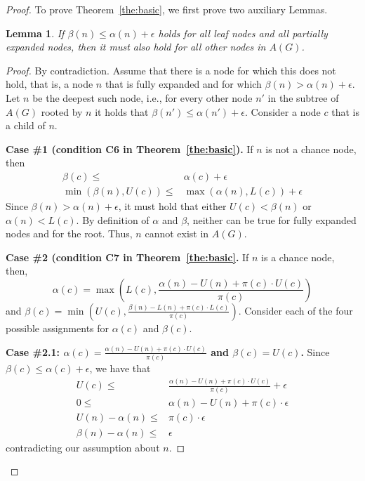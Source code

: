 \documentclass[letterpaper]{article} %
\newtheorem{lemma}{Lemma}
\newcommand{\pess}{\mathit{L}}
\newcommand{\opti}{\mathit{U}}
\begin{document}
\begin{proof}
To prove Theorem~\ref{the:basic}, we first prove two auxiliary Lemmas. 
\begin{lemma}
If $\beta(n)\leq \alpha(n)+\epsilon$ holds for all leaf nodes and all partially expanded nodes, then it must also hold for all other nodes in $A(G)$. 
\label{lem:bounded-beta}
\end{lemma}
\begin{proof}
By contradiction. Assume that there is a node for which this does not hold, that is, a node $n$ that is fully expanded and for which $\beta(n)> \alpha(n)+\epsilon$. 
Let $n$ be the deepest such node, i.e., for every other node $n'$ in the subtree of $A(G)$ rooted by $n$ it holds that $\beta(n')\leq \alpha(n')+\epsilon$.  
Consider a node $c$ that is a child of $n$. 

{\bf Case \#1 (condition C6 in Theorem~\ref{the:basic}).} 
If $n$ is not a chance node, then 
\begin{align}
\beta(c) \leq & \alpha(c)+\epsilon \\
\min(\beta(n), \opti(c)) \leq & \max(\alpha(n), \pess(c))+\epsilon
\end{align}
Since $\beta(n)>\alpha(n)+\epsilon$, 
it must hold that either $\opti(c)<\beta(n)$
or $\alpha(n)<\pess(c)$. 
By definition of $\alpha$ and $\beta$, neither can be true for fully expanded nodes
and for the root. Thus, $n$ cannot exist in $A(G)$. 


{\bf Case \#2 (condition C7 in Theorem~\ref{the:basic}.} 
If $n$ is a chance node, then, 
\[\alpha(c)=\max(\pess(c), \frac{\alpha(n)-\opti(n)+\pi(c)\cdot\opti(c)}{\pi(c)})\]
and $\beta(c)=\min(\opti(c), \frac{\beta(n)-\pess(n)+\pi(c)\cdot\pess(c)}{\pi(c)})$.
Consider each of the four possible assignments for $\alpha(c)$ and $\beta(c)$. 

{\bf Case \#2.1: $\alpha(c)=\frac{\alpha(n)-\opti(n)+\pi(c)\cdot\opti(c)}{\pi(c)}$ 
	and $\beta(c)=\opti(c)$.} 
Since $\beta(c)\leq \alpha(c)+\epsilon$, we have that
\begin{align}
\opti(c) \leq & \frac{\alpha(n)-\opti(n)+\pi(c)\cdot\opti(c)}{\pi(c)}+\epsilon \\
0 \leq & \alpha(n)-\opti(n)+\pi(c)\cdot\epsilon \\
\opti(n)-\alpha(n) \leq & \pi(c)\cdot\epsilon \\
\beta(n)-\alpha(n) \leq & \epsilon 
\end{align}
contradicting our assumption about $n$. 


\end{proof}
\end{proof}
\end{document}
